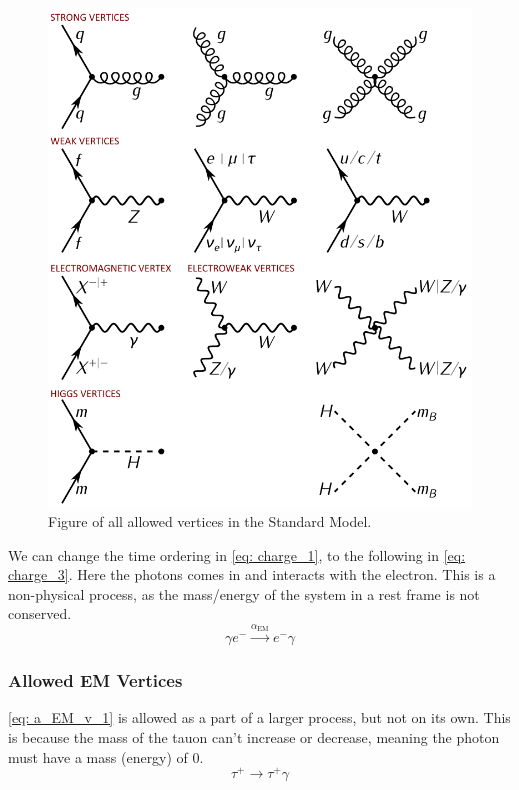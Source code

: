 \begin{figure}[h!]
\centering
\includegraphics[width = \textwidth]{feynman_diagram_vertices.png}
\caption{Figure of all allowed vertices in the Standard Model.}
\label{fig: feynman_diagram_vertices}
\end{figure}


We can change the time ordering in \cref{eq: charge_1}, to the following in \cref{eq: charge_3}. Here the photons comes in and interacts with the electron. This is a non-physical process, as the mass/energy of the system in a rest frame is not conserved. 
\begin{equation}\label{eq: charge_3}
  γ e^{-} \stackrel{α_{\text{EM}}}{→} e^{-} γ
\end{equation}

\subsubsection{Allowed EM Vertices}
\cref{eq: a_EM_v_1} is allowed as a part of a larger process, but not on its own. This is because the mass of the tauon can't increase or decrease, meaning the photon must have a mass (energy) of 0.
\begin{equation}\label{eq: a_EM_v_1}
τ^{+} → τ^{+}γ
\end{equation}


